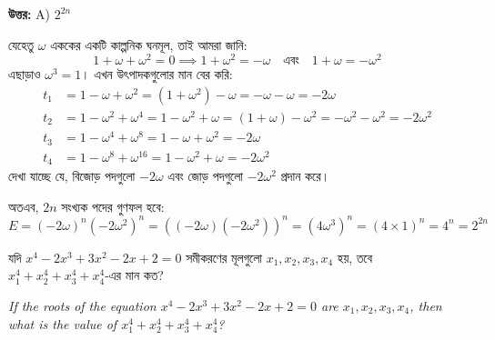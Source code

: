 \documentclass[12pt, a4paper]{article}
\begin{document}
\vspace{0.5em}
\begin{tcolorbox}[answerbox]
    \textbf{\color{success} উত্তর:} A) $2^{2n}$
\end{tcolorbox}
\vspace{1em}

\begin{tcolorbox}[solutionbox={সমাধান (Solution)}]
    \noindent
    যেহেতু $\omega$ এককের একটি কাল্পনিক ঘনমূল, তাই আমরা জানি:
    \[ 1 + \omega + \omega^2 = 0 \implies 1 + \omega^2 = -\omega \quad \text{এবং} \quad 1 + \omega = -\omega^2 \]
    এছাড়াও $\omega^3 = 1$। এখন উৎপাদকগুলোর মান বের করি:
    \begin{align*}
        t_1 &= 1 - \omega + \omega^2 = (1+\omega^2) - \omega = -\omega - \omega = -2\omega \\
        t_2 &= 1 - \omega^2 + \omega^4 = 1 - \omega^2 + \omega = (1+\omega) - \omega^2 = -\omega^2 - \omega^2 = -2\omega^2 \\
        t_3 &= 1 - \omega^4 + \omega^8 = 1 - \omega + \omega^2 = -2\omega \\
        t_4 &= 1 - \omega^8 + \omega^{16} = 1 - \omega^2 + \omega = -2\omega^2
    \end{align*}
    দেখা যাচ্ছে যে, বিজোড় পদগুলো $-2\omega$ এবং জোড় পদগুলো $-2\omega^2$ প্রদান করে। 
    
    \vspace{0.5em}
    অতএব, $2n$ সংখ্যক পদের গুণফল হবে:
    \[ E = (-2\omega)^n (-2\omega^2)^n = ((-2\omega)(-2\omega^2))^n = (4\omega^3)^n = (4 \times 1)^n = 4^n = 2^{2n} \]
\end{tcolorbox}
\begin{tcolorbox}[questionbox={প্রশ্ন (Question) 50}]
    \noindent
    যদি $x^4 - 2x^3 + 3x^2 - 2x + 2 = 0$ সমীকরণের মূলগুলো $x_1, x_2, x_3, x_4$ হয়, তবে $x_1^4 + x_2^4 + x_3^4 + x_4^4$-এর মান কত?
    
    \vspace{0.8em}
    \begin{english}
    \noindent\textit{\color{darkgray}
    If the roots of the equation $x^4 - 2x^3 + 3x^2 - 2x + 2 = 0$ are $x_1, x_2, x_3, x_4$, then what is the value of $x_1^4 + x_2^4 + x_3^4 + x_4^4$?
    }
    \end{english}
\end{tcolorbox}
\end{document}
